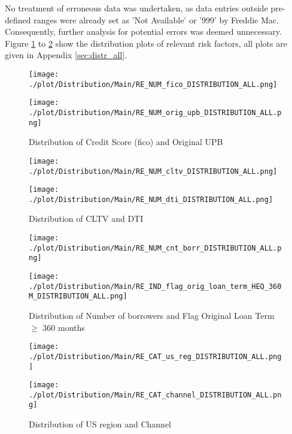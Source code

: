 No treatment of erroneous data was undertaken, as data entries outside pre-defined ranges were already set as 'Not Available' or '999' by Freddie Mac. Consequently, further analysis for potential errors was deemed unnecessary.
Figure \ref{fig:re_distr1} to \ref{fig:re_distr4} show the distribution plots of relevant risk factors, all plots are given in Appendix \ref{sec:distr_all}.

\begin{figure}[H]
\begin{minipage}{.5\textwidth}
	\centering
	\texttt{[image: ./plot/Distribution/Main/RE\_NUM\_fico\_DISTRIBUTION\_ALL.png]}
\end{minipage}%
\begin{minipage}{.5\textwidth}
	\centering
	\texttt{[image: ./plot/Distribution/Main/RE\_NUM\_orig\_upb\_DISTRIBUTION\_ALL.png]}
\end{minipage}
    \caption{Distribution of Credit Score (fico) and Original UPB}
    \label{fig:re_distr1}
\end{figure}
\begin{figure}[H]
\begin{minipage}{.5\textwidth}
	\centering
	\texttt{[image: ./plot/Distribution/Main/RE\_NUM\_cltv\_DISTRIBUTION\_ALL.png]}
\end{minipage}%
\begin{minipage}{.5\textwidth}
	\centering
	\texttt{[image: ./plot/Distribution/Main/RE\_NUM\_dti\_DISTRIBUTION\_ALL.png]}
\end{minipage}
    \caption{Distribution of CLTV and DTI}
\end{figure}
\begin{figure}[H]
\begin{minipage}{.5\textwidth}
	\centering
	\texttt{[image: ./plot/Distribution/Main/RE\_NUM\_cnt\_borr\_DISTRIBUTION\_ALL.png]}
\end{minipage}%
\begin{minipage}{.5\textwidth}
	\centering
	\texttt{[image: ./plot/Distribution/Main/RE\_IND\_flag\_orig\_loan\_term\_HEQ\_360M\_DISTRIBUTION\_ALL.png]}
\end{minipage}
    \caption{Distribution of Number of borrowers and Flag Original Loan Term $\geq$ 360 months}
\end{figure}
\begin{figure}[H]
\begin{minipage}{.5\textwidth}
	\centering
	\texttt{[image: ./plot/Distribution/Main/RE\_CAT\_us\_reg\_DISTRIBUTION\_ALL.png]}
\end{minipage}%
\begin{minipage}{.5\textwidth}
	\centering
	\texttt{[image: ./plot/Distribution/Main/RE\_CAT\_channel\_DISTRIBUTION\_ALL.png]}
\end{minipage}
    \caption{Distribution of US region and Channel}
    \label{fig:re_distr4}
\end{figure}

